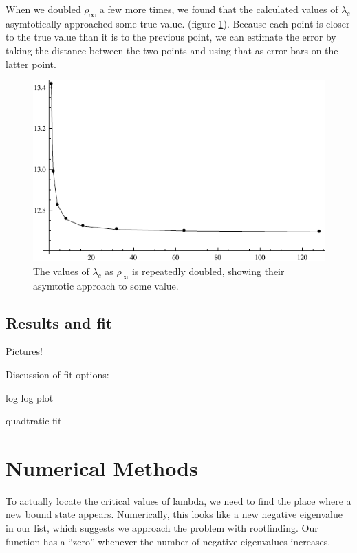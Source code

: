\documentclass[12pt,twoside]{reedthesis}
\begin{document}
When we doubled $\rho_{\infty}$ a few more times, we found that the calculated values of $\lambda_c$ asymtotically approached some true value. (figure \ref{fig:asymtote}). Because each point is closer to the true value than it is to the previous point, we can estimate the error by taking the distance between the two points and using that as error bars on the latter point.

\begin{figure}[h]
\centering
\includegraphics{Figures/asymtote}
\caption[Asymtotic behavior of $\lambda_c (\rho_{\infty})$]{The values of $\lambda_c$ as $\rho_{\infty}$ is repeatedly doubled, showing their asymtotic approach to some value.}
\label{fig:asymtote}
\end{figure} 

\section{Results and fit}
Pictures!

Discussion of fit options:

log log plot

quadtratic fit


%
%
%	
%
\appendix
\chapter{Numerical Methods}
To actually locate the critical values of lambda, we need to find the place where a new bound state appears. Numerically, this looks like a new negative eigenvalue in our list, which suggests we approach the problem with rootfinding. Our function has a ``zero'' whenever the number of negative eigenvalues increases.
\end{document}
